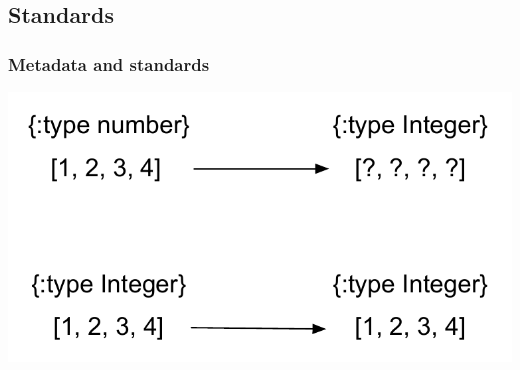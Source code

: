 \documentclass{beamer}
\begin{document}
\subsection{Standards}

\begin{frame}
  \frametitle{Metadata and standards}
  \begin{center}
  \includegraphics[scale=0.7]{graphics/metadataStandards.pdf}
  \end{center}

  
\end{frame}
\end{document}
